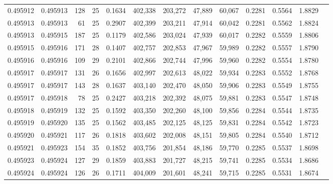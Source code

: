 \begin{tabular}{rrrrrrrrrrrrr}
0.495912 & 0.495913 & 128 &  25 &                                     0.1634 & 402,338 & 203,272 &  47,889 &  60,067 & 0.2281 & 0.5564 & 1.8829 \\
0.495913 & 0.495913 &  61 &  25 &                                     0.2907 & 402,399 & 203,211 &  47,914 &  60,042 & 0.2281 & 0.5562 & 1.8824 \\
0.495913 & 0.495915 & 187 &  25 &                                     0.1179 & 402,586 & 203,024 &  47,939 &  60,017 & 0.2282 & 0.5559 & 1.8806 \\
0.495915 & 0.495916 & 171 &  28 &                                     0.1407 & 402,757 & 202,853 &  47,967 &  59,989 & 0.2282 & 0.5557 & 1.8790 \\
0.495916 & 0.495916 & 109 &  29 &                                     0.2101 & 402,866 & 202,744 &  47,996 &  59,960 & 0.2282 & 0.5554 & 1.8780 \\
0.495917 & 0.495917 & 131 &  26 &                                     0.1656 & 402,997 & 202,613 &  48,022 &  59,934 & 0.2283 & 0.5552 & 1.8768 \\
0.495917 & 0.495917 & 143 &  28 &                                     0.1637 & 403,140 & 202,470 &  48,050 &  59,906 & 0.2283 & 0.5549 & 1.8755 \\
0.495917 & 0.495918 &  78 &  25 &                                     0.2427 & 403,218 & 202,392 &  48,075 &  59,881 & 0.2283 & 0.5547 & 1.8748 \\
0.495918 & 0.495919 & 132 &  25 &                                     0.1592 & 403,350 & 202,260 &  48,100 &  59,856 & 0.2284 & 0.5544 & 1.8735 \\
0.495919 & 0.495920 & 135 &  25 &                                     0.1562 & 403,485 & 202,125 &  48,125 &  59,831 & 0.2284 & 0.5542 & 1.8723 \\
0.495920 & 0.495921 & 117 &  26 &                                     0.1818 & 403,602 & 202,008 &  48,151 &  59,805 & 0.2284 & 0.5540 & 1.8712 \\
0.495921 & 0.495923 & 154 &  35 &                                     0.1852 & 403,756 & 201,854 &  48,186 &  59,770 & 0.2285 & 0.5537 & 1.8698 \\
0.495923 & 0.495924 & 127 &  29 &                                     0.1859 & 403,883 & 201,727 &  48,215 &  59,741 & 0.2285 & 0.5534 & 1.8686 \\
0.495924 & 0.495924 & 126 &  26 &                                     0.1711 & 404,009 & 201,601 &  48,241 &  59,715 & 0.2285 & 0.5531 & 1.8674 \\

\end{tabular}
